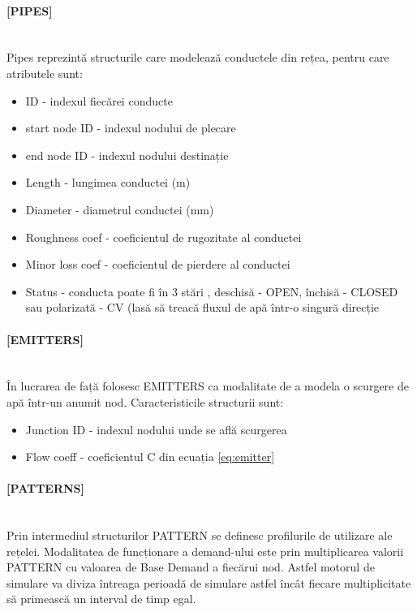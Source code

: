 \paragraph{[PIPES]} \mbox{} \\
Pipes reprezintă structurile care modelează conductele din rețea, pentru care atributele sunt:

\begin{itemize}
    \item ID - indexul fiecărei conducte
    \item start node ID - indexul nodului de plecare
    \item end node ID - indexul nodului destinație
    \item Length - lungimea conductei (m)
    \item Diameter - diametrul conductei (mm)
    \item Roughness coef - coeficientul de rugozitate al conductei
    \item Minor loss coef - coeficientul de pierdere al conductei
    \item Status - conducta poate fi în 3 stări , deschisă - OPEN, închisă - CLOSED sau polarizată - CV (lasă să treacă fluxul de apă într-o singură direcție
\end{itemize}

\paragraph{[EMITTERS]} \mbox{} \\
În lucrarea de față folosesc EMITTERS ca modalitate de a modela o scurgere de apă într-un anumit nod. Caracteristicile structurii sunt:
\begin{itemize}
    \item Junction ID - indexul nodului unde se află scurgerea
    \item Flow coeff - coeficientul C din ecuația \eqref{eq:emitter}
\end{itemize}


\paragraph{[PATTERNS]} \mbox{} \\
Prin intermediul structurilor PATTERN se definesc profilurile de utilizare ale rețelei. Modalitatea de funcționare a demand-ului este prin multiplicarea valorii PATTERN cu valoarea de Base Demand a fiecărui nod. Astfel motorul de simulare va diviza întreaga perioadă de simulare astfel încât fiecare multiplicitate să primească un interval de timp egal.

